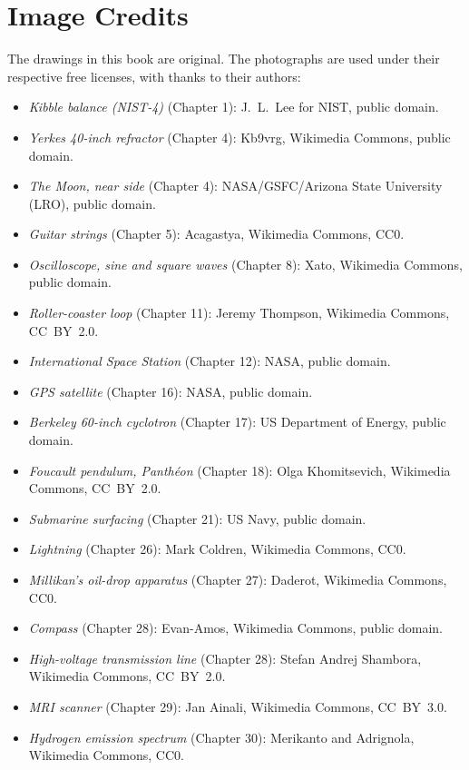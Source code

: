 \chapter*{Image Credits}

The drawings in this book are original. The photographs are used
under their respective free licenses, with thanks to their authors:

\begin{itemize}
  \item \emph{Kibble balance (NIST-4)} (Chapter 1): J.~L.~Lee for NIST, public domain.
  \item \emph{Yerkes 40-inch refractor} (Chapter 4): Kb9vrg, Wikimedia Commons, public domain.
  \item \emph{The Moon, near side} (Chapter 4): NASA/GSFC/Arizona State University (LRO), public domain.
  \item \emph{Guitar strings} (Chapter 5): Acagastya, Wikimedia Commons, CC0.
  \item \emph{Oscilloscope, sine and square waves} (Chapter 8): Xato, Wikimedia Commons, public domain.
  \item \emph{Roller-coaster loop} (Chapter 11): Jeremy Thompson, Wikimedia Commons, CC~BY~2.0.
  \item \emph{International Space Station} (Chapter 12): NASA, public domain.
  \item \emph{GPS satellite} (Chapter 16): NASA, public domain.
  \item \emph{Berkeley 60-inch cyclotron} (Chapter 17): US Department of Energy, public domain.
  \item \emph{Foucault pendulum, Panth\'eon} (Chapter 18): Olga Khomitsevich, Wikimedia Commons, CC~BY~2.0.
  \item \emph{Submarine surfacing} (Chapter 21): US Navy, public domain.
  \item \emph{Lightning} (Chapter 26): Mark Coldren, Wikimedia Commons, CC0.
  \item \emph{Millikan's oil-drop apparatus} (Chapter 27): Daderot, Wikimedia Commons, CC0.
  \item \emph{Compass} (Chapter 28): Evan-Amos, Wikimedia Commons, public domain.
  \item \emph{High-voltage transmission line} (Chapter 28): Stefan Andrej Shambora, Wikimedia Commons, CC~BY~2.0.
  \item \emph{MRI scanner} (Chapter 29): Jan Ainali, Wikimedia Commons, CC~BY~3.0.
  \item \emph{Hydrogen emission spectrum} (Chapter 30): Merikanto and Adrignola, Wikimedia Commons, CC0.
\end{itemize}

